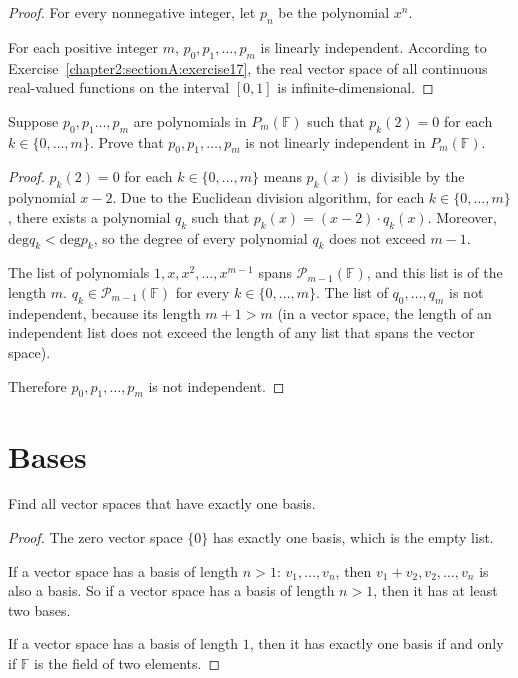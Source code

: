\begin{proof}
    For every nonnegative integer, let $p_{n}$ be the polynomial $x^{n}$.

    For each positive integer $m$, $p_{0}, p_{1}, \ldots, p_{m}$ is linearly independent. According to Exercise~\ref{chapter2:sectionA:exercise17}, the real vector space of all continuous real-valued functions on the interval $[0, 1]$ is infinite-dimensional.
\end{proof}

\begin{exercise}
    Suppose $p_{0}, p_{1}  \ldots, p_{m}$ are polynomials in $P_{m}(\mathbb{F})$ such that $p_{k}(2) = 0$ for each $k \in \{0, \ldots, m\}$. Prove that $p_{0}, p_{1}, \ldots, p_{m}$ is not linearly independent in $P_{m} (\mathbb{F})$.
\end{exercise}

\begin{proof}
    $p_{k}(2) = 0$ for each $k\in\{ 0, \ldots, m \}$ means $p_{k}(x)$ is divisible by the polynomial $x - 2$. Due to the Euclidean division algorithm, for each $k\in\{ 0, \ldots, m \}$, there exists a polynomial $q_{k}$ such that $p_{k}(x) = (x-2)\cdot q_{k}(x)$. Moreover, $\text{deg} q_{k} < \text{deg} p_{k}$, so the degree of every polynomial $q_{k}$ does not exceed $m - 1$.

    The list of polynomials $1, x, x^{2}, \ldots, x^{m-1}$ spans $\mathcal{P}_{m-1}(\mathbb{F})$, and this list is of the length $m$. $q_{k}\in \mathcal{P}_{m-1}(\mathbb{F})$ for every $k\in\{ 0,\ldots, m \}$. The list of $q_{0}, \ldots, q_{m}$ is not independent, because its length $m + 1 > m$ (in a vector space, the length of an independent list does not exceed the length of any list that spans the vector space).

    Therefore $p_{0}, p_{1}, \ldots, p_{m}$ is not independent.
\end{proof}

\section{Bases}

\begin{exercise}
    Find all vector spaces that have exactly one basis.
\end{exercise}

\begin{proof}
    The zero vector space $\{ 0 \}$ has exactly one basis, which is the empty list.

    If a vector space has a basis of length $n > 1$: $v_{1}, \ldots, v_{n}$, then $v_{1} + v_{2}, v_{2}, \ldots, v_{n}$ is also a basis. So if a vector space has a basis of length $n > 1$, then it has at least two bases.

    If a vector space has a basis of length $1$, then it has exactly one basis if and only if $\mathbb{F}$ is the field of two elements.
\end{proof}

